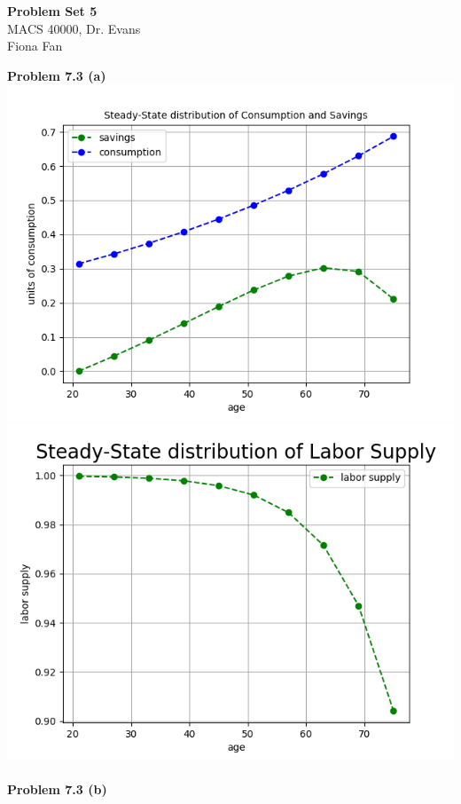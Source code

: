 \documentclass[letterpaper,12pt]{article}
\theoremstyle{definition}
\begin{document}
\begin{flushleft}
  \textbf{\large{Problem Set 5}} \\
  MACS 40000, Dr. Evans \\
  Fiona Fan
\end{flushleft}

\vspace{5mm}

\noindent\textbf{Problem 7.3 (a)}\\
\includegraphics[scale=0.5]{images_SS/ss_bc.png}
\includegraphics[scale=0.5]{images_SS/ss_n}\\
\\
\noindent\textbf{Problem 7.3 (b)}\\
\end{document}
